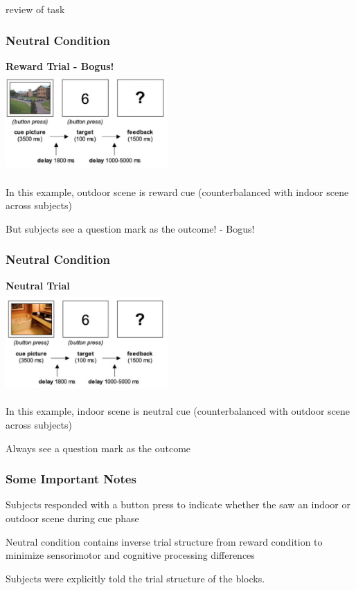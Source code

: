 \documentclass{beamer}
\begin{document}
\begin{section}{review of task}
\begin{frame}
\frametitle{Neutral Condition}
\begin{center}
\bf{Reward Trial - Bogus!} \\
	\includegraphics[height=38mm,width=62mm]{bogusrewardcond} \\
	\begin{itemize}
		\footnotesize{
		\item In this example, outdoor scene is reward cue (counterbalanced with indoor scene across subjects)
		\item But subjects see a question mark as the outcome! - Bogus! }
	\end{itemize}
\end{center}
\end{frame}

\begin{frame}
\frametitle{Neutral Condition}
\begin{center}
\bf{Neutral Trial} \\
	\includegraphics[height=38mm,width=62mm]{neutralcond} \\
	\begin{itemize}
		\footnotesize{
		\item In this example, indoor scene is neutral cue (counterbalanced with outdoor scene across subjects)
		\item Always see a question mark as the outcome }
	\end{itemize}
\end{center}
\end{frame}

\begin{frame}
\frametitle{Some Important Notes}
\begin{itemize}
    {\small 
	\item Subjects responded with a button press to indicate whether the saw an indoor or outdoor scene during cue phase
	\item Neutral condition contains inverse trial structure from reward condition to minimize sensorimotor and cognitive processing differences
	\item Subjects were explicitly told the trial structure of the blocks.
	}
\end{itemize}
\end{frame}


\end{section}
\end{document}
